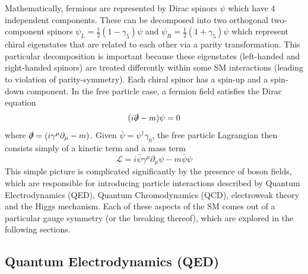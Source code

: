 Mathematically, fermions are represented by Dirac spinors $\psi$ which have 4 independent components. 
These can be decomposed into two orthogonal two-component spinors $\psi_L = \frac{1}{2}(1-\gamma_5)\psi$ 
and $\psi_R = \frac{1}{2}(1+\gamma_5)\psi$ which represent chiral eigenstates that are related to each other 
via a parity transformation. This particular decomposition is important because these eigenstates (left-handed 
and right-handed spinors) are treated differently within some SM interactions (leading to violation of 
parity-symmetry). Each chiral spinor has a spin-up and a spin-down component. In the free particle case, a 
fermion field satisfies the Dirac equation 
\begin{equation}
(i\slashed{\partial} - m)\psi = 0
\end{equation}
where $\slashed{\partial} = (i\gamma^{\mu}\partial_{\mu} - m)$. Given $\bar{\psi} = \psi^{\dag}\gamma_0$, 
the free particle Lagrangian then consists simply of a kinetic term and a mass term
\begin{equation}
\mathcal{L} = i\bar{\psi}\gamma^{\mu}\partial_{\mu}\psi - m\bar{\psi}\psi
\end{equation}
This simple picture is complicated significantly by the presence of boson fields, which are responsible for 
introducing particle interactions described by Quantum Electrodynamics (QED), Quantum Chromodynamics 
(QCD), electroweak theory and the Higgs mechanism. Each of these aspects of the SM comes out of a particular 
gauge symmetry (or the breaking thereof), which are explored in the following sections.

\subsection{Quantum Electrodynamics (QED)}

